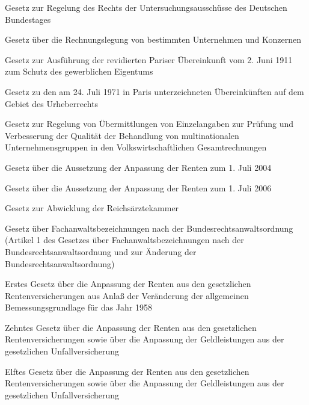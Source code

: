 \item[{PUAG}] Gesetz zur Regelung des Rechts der Untersuchungsausschüsse des Deutschen Bundestages

\item[{PublG}] Gesetz über die Rechnungslegung von bestimmten Unternehmen und Konzernen

\item[{PVÜAG}] Gesetz zur Ausführung der revidierten Pariser Übereinkunft vom 2. Juni 1911 zum Schutz des gewerblichen Eigentums

\item[{PVÜG}] Gesetz zu den am 24. Juli 1971 in Paris unterzeichneten Übereinkünften auf dem Gebiet des Urheberrechts

\item[{QVG}] Gesetz zur Regelung von Übermittlungen von Einzelangaben zur Prüfung und Verbesserung der Qualität der Behandlung von multinationalen Unternehmensgruppen in den Volkswirtschaftlichen Gesamtrechnungen

\item[{RAAG}] Gesetz über die Aussetzung der Anpassung der Renten zum 1. Juli 2004

\item[{RAAG-2006}] Gesetz über die Aussetzung der Anpassung der Renten zum 1. Juli 2006

\item[{RÄKammerAbwG}] Gesetz zur Abwicklung der Reichsärztekammer

\item[{RAFachBezG}] Gesetz über Fachanwaltsbezeichnungen nach der Bundesrechtsanwaltsordnung (Artikel 1 des Gesetzes über Fachanwaltsbezeichnungen nach der Bundesrechtsanwaltsordnung und zur Änderung der Bundesrechtsanwaltsordnung)

\item[{RAG-1}] Erstes Gesetz über die Anpassung der Renten aus den gesetzlichen Rentenversicherungen aus Anlaß der Veränderung der allgemeinen Bemessungsgrundlage für das Jahr 1958

\item[{RAG-10}] Zehntes Gesetz über die Anpassung der Renten aus den gesetzlichen Rentenversicherungen sowie über die Anpassung der Geldleistungen aus der gesetzlichen Unfallversicherung

\item[{RAG-11}] Elftes Gesetz über die Anpassung der Renten aus den gesetzlichen Rentenversicherungen sowie über die Anpassung der Geldleistungen aus der gesetzlichen Unfallversicherung

